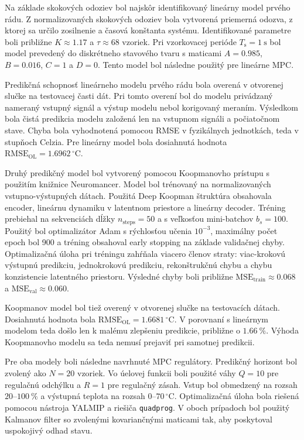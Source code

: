 Na základe skokových odoziev bol najskôr identifikovaný lineárny model prvého rádu. Z normalizovaných skokových odoziev bola vytvorená priemerná odozva, z ktorej sa určilo zosilnenie a časová konštanta systému. Identifikované parametre boli približne $K \approx 1.17$ a $\tau \approx 68$ vzoriek. Pri vzorkovacej perióde $T_{\mathrm{s}} = 1~\mathrm{s}$ bol model prevedený do diskrétneho stavového tvaru s maticami $A = 0.985$, $B = 0.016$, $C = 1$ a $D = 0$. Tento model bol následne použitý pre lineárne MPC.

Predikčná schopnosť lineárneho modelu prvého rádu bola overená v otvorenej slučke na testovacej časti dát. Pri tomto overení bol do modelu privádzaný nameraný vstupný signál a výstup modelu nebol korigovaný meraním. Výsledkom bola čistá predikcia modelu založená len na vstupnom signáli a počiatočnom stave. Chyba bola vyhodnotená pomocou RMSE v fyzikálnych jednotkách, teda v stupňoch Celzia. Pre lineárny model bola dosiahnutá hodnota $\mathrm{RMSE}_{\mathrm{OL}} = 1.6962\,^\circ\mathrm{C}$.

Druhý predikčný model bol vytvorený pomocou Koopmanovho prístupu s použitím knižnice Neuromancer. Model bol trénovaný na normalizovaných vstupno-výstupných dátach. Použitá Deep Koopman štruktúra obsahovala encoder, lineárnu dynamiku v latentnom priestore a lineárny decoder. Tréning prebiehal na sekvenciách dĺžky $n_{\mathrm{steps}} = 50$ a s veľkosťou mini-batchov $b_s = 100$. Použitý bol optimalizátor Adam s rýchlosťou učenia $10^{-3}$, maximálny počet epoch bol 900 a tréning obsahoval early stopping na základe validačnej chyby. Optimalizačná úloha pri tréningu zahŕňala viacero členov straty: viac-krokovú výstupnú predikciu, jednokrokovú predikciu, rekonštrukčnú chybu a chybu konzistencie latentného priestoru. Výsledné chyby boli približne $\mathrm{MSE}_{\mathrm{train}} \approx 0.068$ a $\mathrm{MSE}_{\mathrm{val}} \approx 0.060$.

Koopmanov model bol tiež overený v otvorenej slučke na testovacích dátach. Dosiahnutá hodnota bola $\mathrm{RMSE}_{\mathrm{OL}} = 1.6681\,^\circ\mathrm{C}$. V porovnaní s lineárnym modelom teda došlo len k malému zlepšeniu predikcie, približne o $1.66~\%$. Výhoda Koopmanovho modelu sa teda nemusí prejaviť pri samotnej predikcii.

Pre oba modely boli následne navrhnuté MPC regulátory. Predikčný horizont bol zvolený ako $N = 20$ vzoriek. Vo úelovej funkcii boli použité váhy $Q = 10$ pre regulačnú odchýlku a $R = 1$ pre regulačný zásah. Vstup bol obmedzený na rozsah $20$--$100~\%$ a výstupná teplota na rozsah $0$--$70\,^\circ\mathrm{C}$. Optimalizačná úloha bola riešená pomocou nástroja YALMIP a riešiča \texttt{quadprog}. V oboch prípadoch bol použitý Kalmanov filter so zvolenými kovariančnými maticami tak, aby poskytoval uspokojivý odhad stavu.

